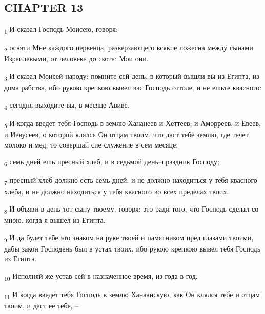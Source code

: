 \subsection{CHAPTER 13}
\begin{tcolorbox}
\textsubscript{1} И сказал Господь Моисею, говоря:
\end{tcolorbox}
\begin{tcolorbox}
\textsubscript{2} освяти Мне каждого первенца, разверзающего всякие ложесна между сынами Израилевыми, от человека до скота: Мои они.
\end{tcolorbox}
\begin{tcolorbox}
\textsubscript{3} И сказал Моисей народу: помните сей день, в который вышли вы из Египта, из дома рабства, ибо рукою крепкою вывел вас Господь оттоле, и не ешьте квасного:
\end{tcolorbox}
\begin{tcolorbox}
\textsubscript{4} сегодня выходите вы, в месяце Авиве.
\end{tcolorbox}
\begin{tcolorbox}
\textsubscript{5} И когда введет тебя Господь в землю Хананеев и Хеттеев, и Аморреев, и Евеев, и Иевусеев, о которой клялся Он отцам твоим, что даст тебе землю, где течет молоко и мед, то совершай сие служение в сем месяце;
\end{tcolorbox}
\begin{tcolorbox}
\textsubscript{6} семь дней ешь пресный хлеб, и в седьмой день--праздник Господу;
\end{tcolorbox}
\begin{tcolorbox}
\textsubscript{7} пресный хлеб должно есть семь дней, и не должно находиться у тебя квасного хлеба, и не должно находиться у тебя квасного во всех пределах твоих.
\end{tcolorbox}
\begin{tcolorbox}
\textsubscript{8} И объяви в день тот сыну твоему, говоря: это ради того, что Господь сделал со мною, когда я вышел из Египта.
\end{tcolorbox}
\begin{tcolorbox}
\textsubscript{9} И да будет тебе это знаком на руке твоей и памятником пред глазами твоими, дабы закон Господень был в устах твоих, ибо рукою крепкою вывел тебя Господь из Египта.
\end{tcolorbox}
\begin{tcolorbox}
\textsubscript{10} Исполняй же устав сей в назначенное время, из года в год.
\end{tcolorbox}
\begin{tcolorbox}
\textsubscript{11} И когда введет тебя Господь в землю Ханаанскую, как Он клялся тебе и отцам твоим, и даст ее тебе, --
\end{tcolorbox}
